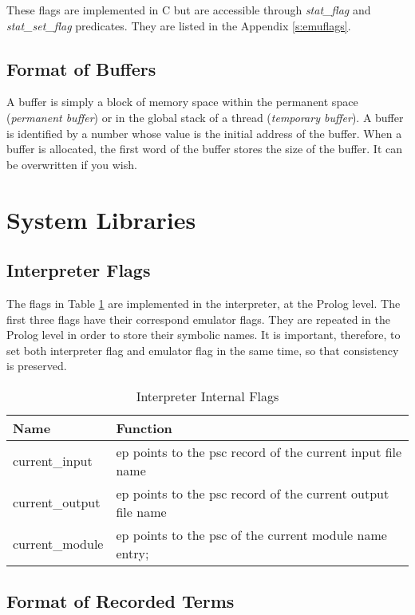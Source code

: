 \documentclass[11pt]{article}
\begin{document}
These flags are implemented in C but are accessible through {\it stat\_flag}
and {\it stat\_set\_flag} predicates. They are listed in the Appendix
\ref{s:emuflags}.


\subsection{Format of Buffers}


A buffer is simply a block of memory space within the permanent
space ({\it permanent buffer}) or in the global stack of a thread
({\it temporary buffer}). A buffer is identified by a number
whose value is the initial address of the buffer.
When a buffer is allocated,
the first word of the buffer stores the size of the buffer. 
It can be overwritten if you wish.


\section{System Libraries} \label{sec:libs}

\subsection{Interpreter Flags}

The flags in Table \ref{t:interpflag} are implemented in the
interpreter, at the Prolog level. The first three flags have their
correspond emulator flags. They are repeated in the Prolog level in order
to store their symbolic names. It is important, therefore, to set
both interpreter flag and emulator flag in the same time, so that
consistency is preserved.

\begin{table}\centering
\begin{tabular}{l|l}
\hline
Name                &  Function \\
\hline
current\_input  & ep points to the psc record of the current input file name\\
current\_output & ep points to the psc record of the current output file name\\
current\_module & ep points to the psc of the current module name entry; \\
\hline
\end{tabular}
\caption{Interpreter Internal Flags}
\label{t:interpflag}
\end{table}

\subsection{Format of Recorded Terms}
\end{document}
